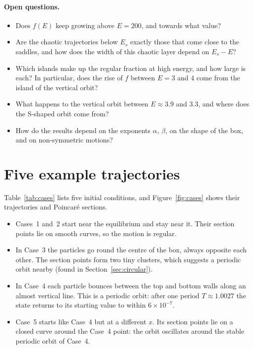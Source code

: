 \documentclass[11pt,a4paper]{article}
\begin{document}
\paragraph{Open questions.}
\begin{itemize}
  \item Does $f(E)$ keep growing above $E=200$, and towards what value?
  \item Are the chaotic trajectories below $E_s$ exactly those that come close
        to the saddles, and how does the width of this chaotic layer depend on
        $E_s-E$?
  \item Which islands make up the regular fraction at high energy, and how
        large is each? In particular, does the rise of $f$ between $E=3$ and
        $4$ come from the island of the vertical orbit?
  \item What happens to the vertical orbit between $E\approx3.9$ and $3.3$,
        and where does the S-shaped orbit come from?
  \item How do the results depend on the exponents $\alpha$, $\beta$, on the
        shape of the box, and on non-symmetric motions?
\end{itemize}

\appendix

\section{Five example trajectories}\label{app:cases}
Table~\ref{tab:cases} lists five initial conditions, and
Figure~\ref{fig:cases} shows their trajectories and Poincar\'e sections.
\begin{itemize}
  \item Cases~1 and~2 start near the equilibrium and stay near it. Their
        section points lie on smooth curves, so the motion is regular.
  \item In Case~3 the particles go round the centre of the box, always
        opposite each other. The section points form two tiny clusters, which
        suggests a periodic orbit nearby (found in Section~\ref{sec:circular}).
  \item In Case~4 each particle bounces between the top and bottom walls along
        an almost vertical line. This is a periodic orbit: after one period
        $T\approx1.0027$ the state returns to its starting value to within
        $6\times10^{-7}$.
  \item Case~5 starts like Case~4 but at a different $x$. Its section points
        lie on a closed curve around the Case~4 point: the orbit oscillates
        around the stable periodic orbit of Case~4.
\end{itemize}
\end{document}
